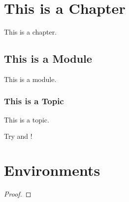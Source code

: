 \documentclass[12pt]{notex}
\author{User}
\date{\today}
\begin{document}
\maketitle

\section{This is a Chapter}

This is a chapter.

\subsection{This is a Module}

This is a module.

\subsubsection{This is a Topic}

This is a topic.

Try \NoTeX and \RossTeX!

\section{Environments}

\begin{theorem}
    \lipsum[1]
\end{theorem}

\begin{proof}
    \lipsum[2]
\end{proof}

\begin{lemma}
    \lipsum[3]
\end{lemma}

\begin{corollary}
    \lipsum[4]
\end{corollary}

\begin{proposition}
    \lipsum[5]
\end{proposition}

\begin{statement*} %
    \lipsum[6]
\end{statement*}

\begin{conjecture*}
    \lipsum[7]
\end{conjecture*}
\end{document}
